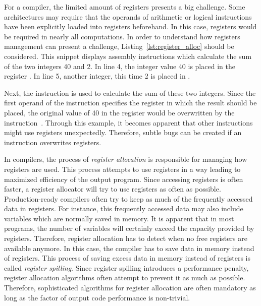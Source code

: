 
For a compiler, the limited amount of registers presents a big challenge.
Some architectures may require that the operands of arithmetic or logical instructions have been explicitly loaded into registers beforehand.
In this case, registers would be required in nearly all computations.
In order to understand how registers management can present a challenge, Listing~\ref{lst:register_alloc} should be considered.
This snippet displays \riscv{} assembly instructions which calculate the sum of the two integers 40 and 2.
In line 4, the integer value 40 is placed in the register .
In line 5, another integer, this time 2 is placed in .

Next, the  instruction is used to calculate the sum of these two integers.
Since the first operand of the instruction specifies the register in which the result should be placed,
the original value of 40 in the register  would be overwritten by the instruction~\cite[reference]{Patterson2017}.
Through this example, it becomes apparent that other instructions might use registers unexpectedly.
Therefore, subtle bugs can be created if an instruction overwrites registers.

In compilers, the process of \emph{register allocation} is responsible for managing how registers are used.
This process attempts to use registers in a way leading to maximized efficiency of the output program.
Since accessing registers is often faster, a register allocator will try to use registers as often as possible.
Production-ready compilers often try to keep as much of the frequently accessed data in registers.
For instance, this frequently accessed data may also include variables which are normally saved in memory.
It is apparent that in most programs, the number of variables will certainly exceed the capacity provided by registers.
Therefore, register allocation has to detect when no free registers are available anymore.
In this case, the compiler has to save data in memory instead of registers.
This process of saving excess data in memory instead of registers is called \emph{register spilling}.
Since register spilling introduces a performance penalty, register allocation algorithms often attempt to prevent it as much as possible.
Therefore, sophisticated algorithms for register allocation are often mandatory as long as the factor of output code performance is non-trivial.

